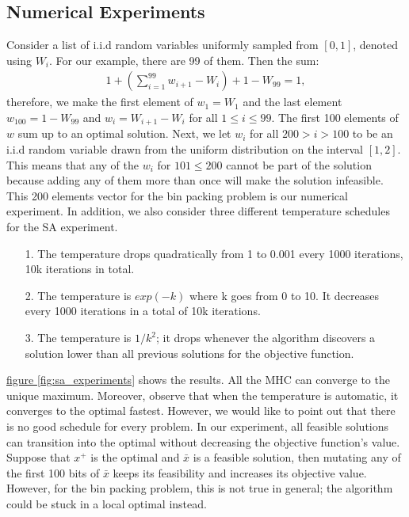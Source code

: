 \documentclass[]{article}
\theoremstyle{definition}
\begin{document}
    \subsection{Numerical Experiments}
        Consider a list of i.i.d random variables uniformly sampled from $[0, 1]$, denoted using $W_i$. For our example, there are 99 of them. Then the sum: 
        \begin{align*}
           1 + \left(
            \sum_{i = 1}^{99} w_{i + 1} - W_i
           \right) + 1 - W_{99} = 1, 
        \end{align*}
        therefore, we make the first element of $w_1 = W_1$ and the last element $w_{100} = 1 - W_{99}$ and $w_i = W_{i + 1} - W_{i}$ for all $1 \le i \le 99$. The first 100 elements of $w$ sum up to an optimal solution. Next, we let $w_i$ for all $200 > i > 100$ to be an i.i.d random variable drawn from the uniform distribution on the interval $[1, 2]$. This means that any of the $w_i$ for $101 \le 200$ cannot be part of the solution because adding any of them more than once will make the solution infeasible. This 200 elements vector for the bin packing problem is our numerical experiment. In addition, we also consider three different temperature schedules for the SA experiment. 
        \begin{itemize}
            \item [1.] The temperature drops quadratically from 1 to 0.001 every 1000 iterations, 10k iterations in total. 
            \item [2.] The temperature is $exp(-k)$ where k goes from 0 to 10. It decreases every 1000 iterations in a total of 10k iterations. 
            \item [3.] The temperature is $1/k^2$; it drops whenever the algorithm discovers a solution lower than all previous solutions for the objective function.
        \end{itemize}
        \hyperref[fig:sa_experiments]{figure \ref*{fig:sa_experiments}} shows the results. All the MHC can converge to the unique maximum. Moreover, observe that when the temperature is automatic, it converges to the optimal fastest. However, we would like to point out that there is no good schedule for every problem. In our experiment, all feasible solutions can transition into the optimal without decreasing the objective function's value. Suppose that $x^+$  is the optimal and $\bar x$ is a feasible solution, then mutating any of the first 100 bits of $\bar x$ keeps its feasibility and increases its objective value. However, for the bin packing problem, this is not true in general; the algorithm could be stuck in a local optimal instead. 
\end{document}
